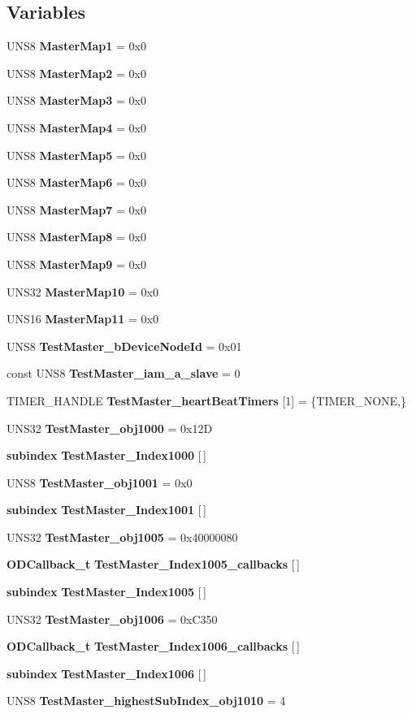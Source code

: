 \subsection*{Variables}
\begin{CompactItemize}
\item 
UNS8 {\bf Master\-Map1} = 0x0
\item 
UNS8 {\bf Master\-Map2} = 0x0
\item 
UNS8 {\bf Master\-Map3} = 0x0
\item 
UNS8 {\bf Master\-Map4} = 0x0
\item 
UNS8 {\bf Master\-Map5} = 0x0
\item 
UNS8 {\bf Master\-Map6} = 0x0
\item 
UNS8 {\bf Master\-Map7} = 0x0
\item 
UNS8 {\bf Master\-Map8} = 0x0
\item 
UNS8 {\bf Master\-Map9} = 0x0
\item 
UNS32 {\bf Master\-Map10} = 0x0
\item 
UNS16 {\bf Master\-Map11} = 0x0
\item 
UNS8 {\bf Test\-Master\_\-b\-Device\-Node\-Id} = 0x01
\item 
const UNS8 {\bf Test\-Master\_\-iam\_\-a\_\-slave} = 0
\item 
TIMER\_\-HANDLE {\bf Test\-Master\_\-heart\-Beat\-Timers} [1] = \{TIMER\_\-NONE,\}
\item 
UNS32 {\bf Test\-Master\_\-obj1000} = 0x12D
\item 
{\bf subindex} {\bf Test\-Master\_\-Index1000} [$\,$]
\item 
UNS8 {\bf Test\-Master\_\-obj1001} = 0x0
\item 
{\bf subindex} {\bf Test\-Master\_\-Index1001} [$\,$]
\item 
UNS32 {\bf Test\-Master\_\-obj1005} = 0x40000080
\item 
{\bf ODCallback\_\-t} {\bf Test\-Master\_\-Index1005\_\-callbacks} [$\,$]
\item 
{\bf subindex} {\bf Test\-Master\_\-Index1005} [$\,$]
\item 
UNS32 {\bf Test\-Master\_\-obj1006} = 0x\-C350
\item 
{\bf ODCallback\_\-t} {\bf Test\-Master\_\-Index1006\_\-callbacks} [$\,$]
\item 
{\bf subindex} {\bf Test\-Master\_\-Index1006} [$\,$]
\item 
UNS8 {\bf Test\-Master\_\-highest\-Sub\-Index\_\-obj1010} = 4
\item 

\end{CompactItemize}
